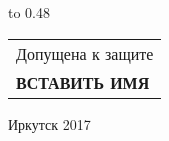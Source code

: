 \vspace{0.8cm}

{
	\noindent\hbox to 0.48\textwidth {%
		\mbox{ } \hfil} %
	\begin{tabular}[t]{l}
		Допущена к защите\\
		\textbf{ВСТАВИТЬ ИМЯ}
	\end{tabular}		
}

\vspace{0.8cm}

\vfill 
\noindent
\begin{minipage}{\textwidth}
	\centering	Иркутск 2017
\end{minipage}